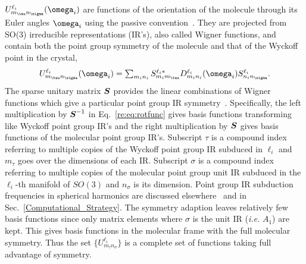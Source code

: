 \documentclass[preprint]{iucr}              %
\newcommand{\mb}[1]{\ensuremath{\mbox{\boldmath $ #1 $}}}
\begin{document}
$U^{\ell_i}_{m_\tau n_\sigma}(\mb{\omega}_i)$ are functions of the
orientation of the molecule through its Euler angles $\mb{\omega}_i$
using the passive convention~\cite{Varshalovich88}.  They are
projected from SO(3) irreducible representations (IR's), also called
Wigner functions, and contain both the point group symmetry of the
molecule and that of the Wyckoff point in the crystal,
\begin{equation}
\label{re:eq:rotfunc}U^{\ell_i}_{m_\tau
n_\sigma}(\mb{\omega}_i)=\sum_{m_i n_i}S^{\ell_i*}_{m_im_\tau}D_{m_i
n_i}^{\ell_i}(\mb{\omega}_i)S^{\ell_i}_{n_in_\sigma}.
\end{equation}
The sparse unitary matrix $\mb{S}$ provides the linear combinations
of Wigner functions which give a particular point group IR
symmetry~\cite{Bradley72}.  Specifically, the left multiplication by
$\mb{S}^{-1}$ in Eq.~\ref{re:eq:rotfunc} gives basis functions
transforming like Wyckoff point group IR's and the right
multiplication by $\mb{S}$ gives basis functions of the molecular
point group IR's. Subscript $\tau$ is a compound index referring to
multiple copies of the Wyckoff point group IR subduced in $\ell_i$
and $m_\tau$ goes over the dimensions of each IR. Subscript $\sigma$
is a compound index referring to multiple copies of the molecular
point group unit IR subduced in the $\ell_i$-th manifold of $SO(3)$
and $n_\sigma$ is its dimension. Point group IR subduction
frequencies in spherical harmonics are discussed
elsewhere~\cite{Bradley72} and in Sec.~\ref{Computational_Strategy}.
The symmetry adaption leaves relatively few basis functions since
only matrix elements where $\sigma$ is the unit IR (\emph{i.e.}
$A_1$) are kept.  This gives basis functions in the molecular frame
with the full molecular symmetry.  Thus the set
$\{U^{\ell_i}_{m_\tau n_\sigma}\}$ is a complete set of functions
taking full advantage of symmetry.
\end{document}
